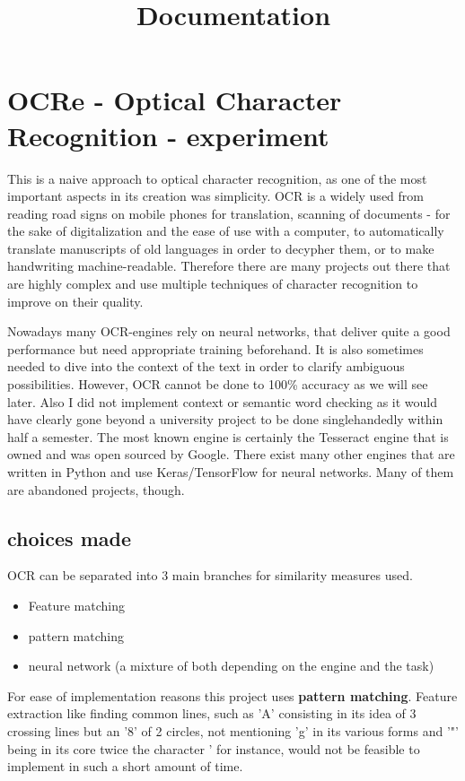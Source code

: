 \documentclass[12pt]{scrartcl}
\begin{document}
\title {Documentation}
\section {OCRe - Optical Character Recognition - experiment}
This is a naive approach to optical character recognition, as one of the most important aspects in its creation was simplicity. OCR is a widely used from reading road signs on mobile phones for translation, scanning of documents - for the sake of digitalization and the ease of use with a computer, to automatically translate manuscripts of old languages in order to decypher them, or to make handwriting machine-readable. Therefore there are many projects out there that are highly complex and use multiple techniques of character recognition to improve on their quality.

Nowadays many OCR-engines rely on neural networks, that deliver quite a good performance but need appropriate training beforehand. It is also sometimes needed to dive into the context of the text in order to clarify ambiguous possibilities. However, OCR cannot be done to 100\% accuracy as we will see later. Also I did not implement context or semantic word checking as it would have clearly gone beyond a university project to be done singlehandedly within half a semester.\newline
The most known engine is certainly the Tesseract engine that is owned and was open sourced by Google.\newline
There exist many other engines that are written in Python and use Keras/TensorFlow for neural networks. Many of them are abandoned projects, though.


\subsection{choices made}
OCR can be separated into 3 main branches for similarity measures used.
\begin{itemize}
\item Feature matching
\item pattern matching
\item neural network (a mixture of both depending on the engine and the task)
\end{itemize}

For ease of implementation reasons this project uses \textbf{pattern matching}.\newline
Feature extraction like finding common lines, such as 'A' consisting in its idea of 3 crossing lines but an '8' of 2 circles, not mentioning 'g' in its various forms and '"' being in its core twice the character ' for instance, would not be feasible to implement in such a short amount of time.
\end{document}
